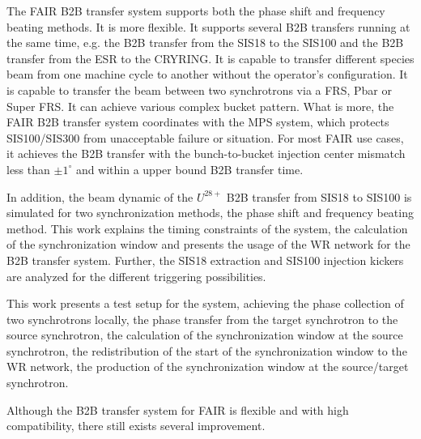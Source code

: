 The FAIR B2B transfer system supports both the phase shift and frequency beating methods. It is more flexible. It supports several B2B transfers running at the same time, e.g. the B2B transfer from the SIS18 to the SIS100 and the B2B transfer from the ESR to the CRYRING. It is capable to transfer different species beam from one machine cycle to another without the operator’s configuration. It is capable to transfer the beam between two synchrotrons via a FRS, Pbar or Super FRS. It can achieve various complex bucket pattern. What is more, the FAIR B2B transfer system coordinates with the MPS system, which protects SIS100/SIS300 from unacceptable failure or situation. For most FAIR use cases, it achieves the B2B transfer with the bunch-to-bucket injection center mismatch less than $\pm1^\circ$ and within a upper bound B2B transfer time.

In addition, the beam dynamic of the $U^{28+}$ B2B transfer from SIS18 to SIS100 is simulated for two synchronization methods, the phase shift and frequency beating method. This work explains the timing constraints of the system, the calculation of the synchronization window and presents the usage of the WR network for the B2B transfer system. Further, the SIS18 extraction and SIS100 injection kickers are analyzed for the different triggering possibilities. 

This work presents a test setup for the system, achieving the phase collection of two synchrotrons locally, the phase transfer from the target synchrotron to the source synchrotron, the calculation of the synchronization window at the source synchrotron, the redistribution of the start of the synchronization window to the WR network, the production of the synchronization window at the source/target synchrotron. 

Although the B2B transfer system for FAIR is flexible and with high compatibility, there still exists several improvement. 

